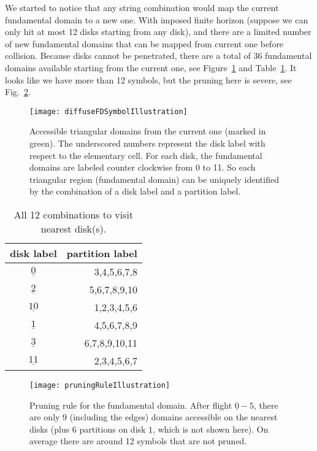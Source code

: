We started to notice that any string combination would map the current fundamental domain to a new one. With imposed finite horizon (suppose we can only hit at most 12 disks starting from any disk), and there are a limited number of new fundamental domains that can be mapped from current one before collision. Because disks cannot be penetrated, there are a total of 36 fundamental domains available starting from the current one, see Figure~\ref{fig:36symbols} and Table~\ref{tab:36symbols}. It looks like we have more than 12 symbols, but the pruning here is severe, see Fig.~\ref{fig:fdSymbolPruning}.
\begin{figure}
\texttt{[image: diffuseFDSymbolIllustration]}
\caption{Accessible triangular domains from the current one (marked in green). The underscored numbers represent the disk label with respect to the elementary cell. For each disk, the fundamental domains are labeled counter clockwise from 0 to 11. So each triangular region (fundamental domain) can be uniquely identified by the combination of a disk label and a partition label.}
\label{fig:36symbols}
\end{figure}
\begin{table}
\begin{center}
\begin{tabular}{c|r}
disk label & partition label \\\hline
$\underline{0}$& 3,4,5,6,7,8\\
$\underline{2}$& 5,6,7,8,9,10\\
$\underline{10}$& 1,2,3,4,5,6\\
$\underline{1}$& 4,5,6,7,8,9\\
$\underline{3}$& 6,7,8,9,10,11\\
$\underline{11}$& 2,3,4,5,6,7\\
\hline
\end{tabular}
\end{center}
\caption{All 12 combinations to visit nearest disk(s). }
\label{tab:36symbols}
\end{table}
\begin{figure}
\texttt{[image: pruningRuleIllustration]}
\caption{Pruning rule for the fundamental domain. After flight $\underline{0}-5$, there are only 9 (including the edges) domains accessible on the nearest disks (plus 6 partitions on disk $\underline{1}$, which is not shown here). On average there are around 12 symbols that are not pruned.}
\label{fig:fdSymbolPruning}
\end{figure}


